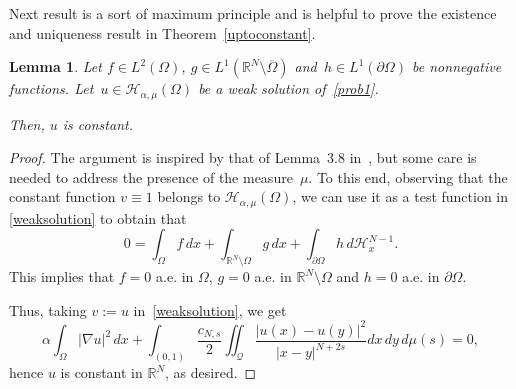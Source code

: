\documentclass[12pt,a4paper,intlimits,sumlimits]{amsart}
\def \R {\mathbb{R}}
\def \Q {\mathcal Q}
\theoremstyle{definition}
\theoremstyle{plain}
\newtheorem{lemma}[definition]{Lemma}
\numberwithin{equation}{section}
\begin{document}
Next result is a sort of maximum principle and is helpful to prove the existence and uniqueness result in Theorem~\ref{uptoconstant}.

\begin{lemma}\label{lemmasoluzionecostante}
Let $f\in L^2(\Omega)$, $g\in L^1(\R^N\setminus\overline\Omega)$ and~$h\in L^1(\partial\Omega)$ be nonnegative functions. Let~$u\in \mathcal{H}_{\alpha,\mu}(\Omega)$ be a weak solution of~\eqref{prob1}.

Then, $u$ is constant.
\end{lemma}

\begin{proof}
The argument is inspired by that of Lemma~3.8 in~\cite{MR3651008}, but some care is needed to address the presence of the measure~$\mu$.
To this end, observing that the constant function $v\equiv 1$ belongs 
to $\mathcal{H}_{\alpha,\mu}(\Omega)$, we can use it as a test function in 
\eqref{weaksolution} to obtain that
\[
0=\int_\Omega f\,dx +\int_{\R^N\setminus\Omega} g\,dx
+\int_{\partial\Omega}h\,d\mathscr{H}_x^{N-1}.
\]
This implies that $f=0$ a.e. in $\Omega$, $g=0$ a.e. in 
$\R^N\setminus\Omega$ and $h=0$ a.e. in $\partial\Omega$.

Thus, taking $v:=u$ in~\eqref{weaksolution}, we get
\[
\alpha \int_\Omega |\nabla u|^2\, dx +\int_{(0, 1)} \frac{c_{N, s}}{2} \iint_{\Q} \frac{|u(x)-u(y)|^2}{|x-y|^{N+2s}} dx\,dy\, d\mu(s)=0,
\]
hence $u$ is constant in $\R^N$, as desired.
\end{proof}
\end{document}
